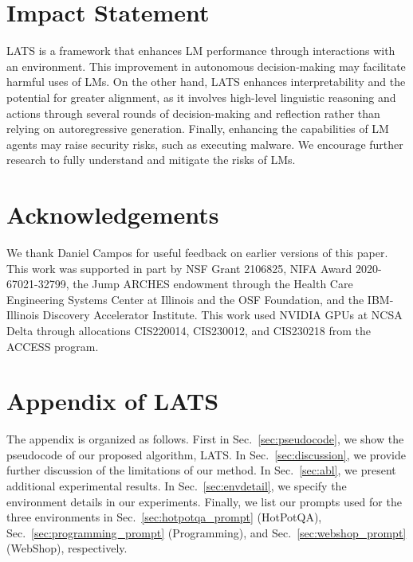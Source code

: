 \documentclass{article}
\theoremstyle{plain}
\theoremstyle{definition}
\theoremstyle{remark}
\begin{document}
\section*{Impact Statement}

LATS is a framework that enhances LM performance through interactions with an environment. This improvement in autonomous decision-making may facilitate harmful uses of LMs. On the other hand, LATS enhances interpretability and the potential for greater alignment, as it involves high-level linguistic reasoning and actions through several rounds of decision-making and reflection rather than relying on autoregressive generation. Finally, enhancing the capabilities of LM agents may raise security risks, such as executing malware. We encourage further research to fully understand and mitigate the risks of LMs.

\section*{Acknowledgements}

We thank Daniel Campos for useful feedback on earlier versions of this paper. This work was supported in part by NSF Grant 2106825, NIFA Award 2020-67021-32799, the Jump ARCHES endowment through the Health Care Engineering Systems Center at Illinois and the OSF Foundation, and the IBM-Illinois Discovery Accelerator Institute. This work used NVIDIA GPUs at NCSA Delta through allocations CIS220014, CIS230012, and CIS230218 from the ACCESS program.




\clearpage

\section*{Appendix of LATS}
\appendix

The appendix is organized as follows. First in Sec.~\ref{sec:pseudocode}, we show the pseudocode of our proposed algorithm, LATS. In Sec.~\ref{sec:discussion}, we provide further discussion of {the limitations of our method}. In Sec.~\ref{sec:abl}, we present additional experimental results. In Sec.~\ref{sec:envdetail}, we specify the environment details in our experiments. Finally, we list our prompts used for the three environments in Sec.~\ref{sec:hotpotqa_prompt} (HotPotQA), Sec.~\ref{sec:programming_prompt} (Programming), and Sec.~\ref{sec:webshop_prompt} (WebShop), respectively.


\end{document}
